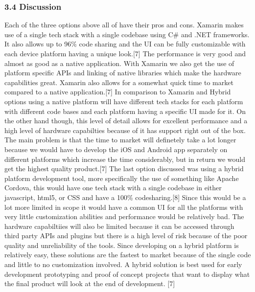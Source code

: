 \documentclass[onecolumn, draftclsnofoot,10pt, compsoc]{IEEEtran}
\begin{document}
\subsubsection{3.4 Discussion}
Each of the three options above all of have their pros and cons. Xamarin makes use of a single tech stack with a single codebase using C\# and .NET frameworks. It also allows up to 96\% code sharing and the UI can be fully customizable with each device platform having a unique look.[7] The performance is very good and almost as good as a native application. With Xamarin we also get the use of platform specific APIs and linking of native libraries which make the hardware capabilities great. Xamarin also allows for a somewhat quick time to market compared to a native application.[7] In comparison to Xamarin and Hybrid options using a native platform will have different tech stacks for each platform with different code bases and each platform having a specific UI made for it. On the other hand though, this level of detail allows for excellent performance and a high level of hardware capabilties because of it has support right out of the box. The main problem is that the time to market will definetely take a lot longer because we would have to develop the iOS and Android app separately on different platforms which increase the time considerably, but in return we would get the highest quality product.[7] The last option discussed was using a hybrid platform development tool, more specifically the use of something like Apache Cordova, this would have one tech stack with a single codebase in either javascript, html5, or CSS and have a 100\% codesharing.[8] Since this would be a lot more limited in scope it would have a common UI for all the platforms with very little customization abilities and performance would be relatively bad. The hardware capabiltiies will also be limited because it can be accessed through third party APIs and plugins but there is a high level of risk because of the poor quality and unreliability of the tools. Since developing on a hybrid platform is relatively easy, these solutions are the fastest to market because of the single code and little to no customization involved. A hybrid solution is best used for early development prototyping and proof of concept projects that want to display what the final product will look at the end of development. [7]
\end{document}
